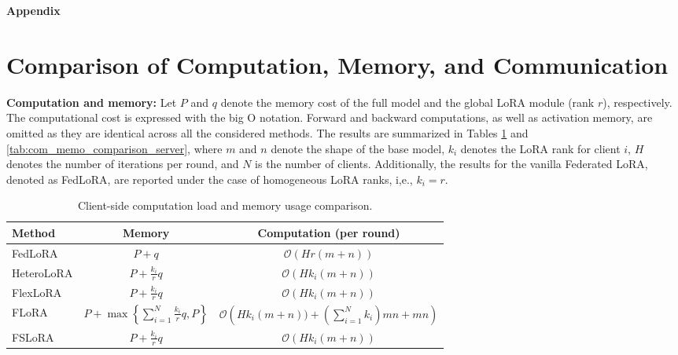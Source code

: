 \documentclass{article} %
\theoremstyle{plain}
\theoremstyle{definition}
\begin{document}
\newpage
\appendix


\begin{center}
    {\bf\Large Appendix}
\end{center}

\startcontents[sections]


\newpage


\section{Comparison of Computation, Memory, and Communication}\label{appen:com_memo_comparison}
\textbf{Computation and memory:}
Let $P$ and $q$ denote the memory cost of the full model and the global LoRA module (rank $r$), respectively. The computational cost is expressed with the big O notation. Forward and backward computations, as well as activation memory, are omitted as they are identical across all the considered methods. The results are summarized in Tables  \ref{tab:com_memo_comparison_client} and \ref{tab:com_memo_comparison_server}, where $m$ and $n$ denote the shape of the base model, $k_i$ denotes the LoRA rank for client $i$, $H$ denotes the number of iterations per round, and $N$ is the number of clients. Additionally, the results for the vanilla Federated LoRA, denoted as FedLoRA, are reported under the case of homogeneous LoRA ranks, i,e., $k_i = r$. 

\begin{table}[H]
\caption{
Client-side computation load and memory usage comparison.
}
\label{tab:com_memo_comparison_client}
\centering
\begin{tabular}{@{}lcc@{}}
\toprule
{Method} & {Memory} & {Computation (per round)} \\
\midrule
FedLoRA &
$P + q$ &
$\mathcal{O}(Hr(m + n))$ \\
HeteroLoRA &
$P + \frac{k_i}{r}q$ &
$\mathcal{O}(Hk_i(m + n))$ \\
FlexLoRA &
$P + \frac{k_i}{r}q$ &
$\mathcal{O}(Hk_i(m + n))$ \\
{FLoRA} &
$P + \max\left\{\sum_{i=1}^N \frac{k_i}{r}q, P\right\}$ &
$\mathcal{O}\left(Hk_i(m + n)) + (\sum_{i=1}^N k_i)mn + mn \right)$ \\
FSLoRA &
$P \!+\! \frac{k_i}{r}q$ &
$\mathcal{O}(Hk_i(m + n))$ \\
\bottomrule
\end{tabular}
\end{table}
\end{document}
